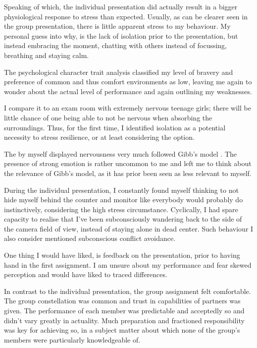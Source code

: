 \documentclass[12pt]{article}
\begin{document}
Speaking of which, the individual presentation did actually result in a bigger
physiological response to stress than expected. Usually, as can be clearer seen
in the group presentation, there is little apparent stress to my behaviour. My
personal guess into why, is the lack of isolation prior to the presentation, but
instead embracing the moment, chatting with others instead of focussing,
breathing and staying calm.

The psychological character trait analysis classified my level of bravery and
preference of common and thus comfort environments as low, leaving me again to
wonder about the actual level of performance and again outlining my weaknesses.

I compare it to an exam room with extremely nervous teenage girls; there will be
little chance of one being able to not be nervous when absorbing the
surroundings. Thus, for the first time, I identified isolation as a potential
necessity to stress resilience, or at least considering the option.

The by myself displayed nervousness very much followed Gibb's
model \cite{gibbs:reflectiveModel}. The presence of strong emotion is rather
uncommon to me and left me to think about the relevance of Gibb's model, as it
has prior been seen as less relevant to myself.
 
During the individual presentation, I constantly found myself thinking to not
hide myself behind the counter and monitor like everybody would probably do
instinctively, considering the high stress circumstance. Cyclically, I had spare
capacity to realise that I've been subconsciously wandering back to the side
of the camera field of view, instead of staying alone in dead center. Such
behaviour I also consider mentioned subconscious conflict avoidance.

One thing I would have liked, is feedback on the presentation, prior to having
hand in the first assignment. I am unsure about my performance and fear skewed
perception and would have liked to traced differences.

In contrast to the individual presentation, the group assignment felt
comfortable. The group constellation was common and trust in capabilities of
partners was given. The performance of each member was predictable and
acceptedly so and didn't vary greatly in actuality. Much preparation and
fractioned responsibility was key for achieving so, in a subject matter about
which none of the group's members were particularly knowledgeable of.
\end{document}
